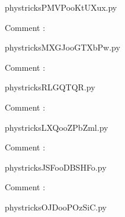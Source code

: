    \newcommand{\CaptionFigPMVPooKtUXux}{<+Type your caption here+>}
    \begin{center}
        
    \end{center}
    phystricksPMVPooKtUXux.py

    Comment : 

    \clearpage
    


    \newcommand{\CaptionFigMXGJooGTXbPw}{<+Type your caption here+>}
    \begin{center}
        
    \end{center}
    phystricksMXGJooGTXbPw.py

    Comment : 

    \clearpage
    


    \newcommand{\CaptionFigRLGQTQR}{<+Type your caption here+>}
    \begin{center}
        
    \end{center}
    phystricksRLGQTQR.py

    Comment : 

    \clearpage
    


    \newcommand{\CaptionFigLXQooZPbZml}{<+Type your caption here+>}
    \begin{center}
        
    \end{center}
    phystricksLXQooZPbZml.py

    Comment : 

    \clearpage
    


    \newcommand{\CaptionFigJSFooDBSHFo}{<+Type your caption here+>}
    \begin{center}
        
    \end{center}
    phystricksJSFooDBSHFo.py

    Comment : 

    \clearpage
    


    \newcommand{\CaptionFigOJDooPOzSiC}{<+Type your caption here+>}
    \begin{center}
        
    \end{center}
    phystricksOJDooPOzSiC.py

